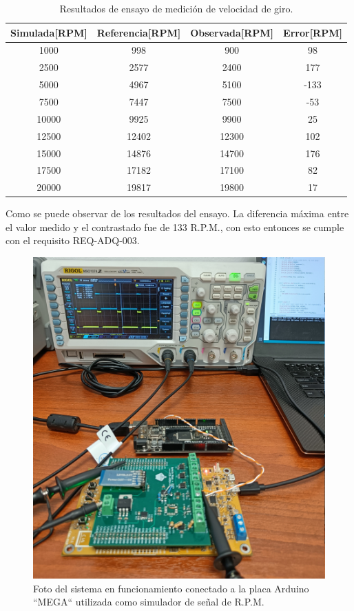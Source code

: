 \begin{table}[htpb]
	\centering
	\caption{Resultados de ensayo de medición de velocidad de giro.}
	\centering
	\begin{tabular}{c c c c}    
		\toprule
		\textbf{Simulada[RPM]} &  \textbf{Referencia[RPM]}   & \textbf{Observada[RPM]} & \textbf{Error[RPM]}\\
		\midrule
		1000	&	998 &	900 & 98\\
		2500	&	2577 & 2400 & 177\\
		5000	&	4967 & 5100 & -133 \\
		7500	&	7447 & 7500 & -53\\
		10000	&	9925 & 9900 & 25\\
		12500	&	12402 & 12300 & 102\\
		15000	&	14876 & 14700 & 176\\
		17500	&	17182 & 17100 & 82\\
		20000	&	19817 & 19800 & 17\\		
		\bottomrule
	\end{tabular}
	\label{tab:ensayo-rpm}
\end{table}

\break

Como se puede observar de los resultados del ensayo. La diferencia máxima entre el valor medido y el contrastado fue de 133 R.P.M., con esto entonces se cumple con el requisito REQ-ADQ-003.

\begin{figure}[t]
\centering
\includegraphics[width=.8\textwidth]{./Figures/foto-rpm.jpg}
\caption{Foto del sistema en funcionamiento conectado a la placa Arduino ``MEGA`` utilizada como simulador de señal de R.P.M.}
\label{fig:foto-rpm}
\end{figure}

